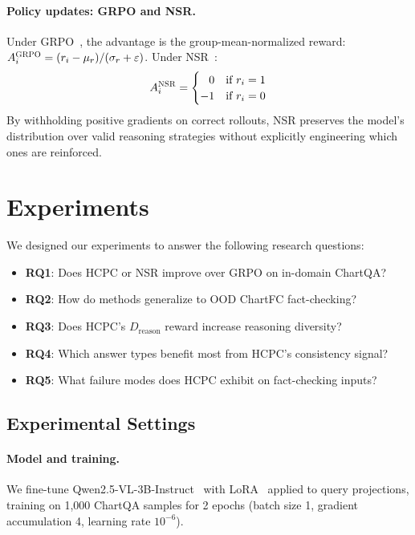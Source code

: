 \documentclass[11pt]{article}
\newcommand{\hcpc}{\textsc{HCPC}}
\newcommand{\grpo}{\textsc{GRPO}}
\newcommand{\nsr}{\textsc{NSR}}
\begin{document}
\paragraph{Policy updates: GRPO and NSR.}
Under \grpo{}~\citep{shao2024deepseekmath}, the advantage is the group-mean-normalized
reward: $A_i^{\grpo} = (r_i - \mu_r)/(\sigma_r + \varepsilon)$.
Under \nsr{}~\citep{zhu2025nsr}:
%
\begin{equation}
  A_i^{\nsr} =
  \begin{cases}
    \phantom{-}0  & \text{if } r_i = 1 \\
    -1            & \text{if } r_i = 0
  \end{cases}
  \label{eq:nsr}
\end{equation}
%
By withholding positive gradients on correct rollouts, \nsr{} preserves the
model's distribution over valid reasoning strategies without explicitly
engineering which ones are reinforced.

\section{Experiments}\label{sec:experiments}

We designed our experiments to answer the following research questions:
\begin{itemize}[leftmargin=*, itemsep=0.1em]
\item \textbf{RQ1}: Does \hcpc{} or \nsr{} improve over \grpo{} on in-domain ChartQA?
\item \textbf{RQ2}: How do methods generalize to OOD ChartFC fact-checking?
\item \textbf{RQ3}: Does \hcpc{}'s $D_\text{reason}$ reward increase reasoning diversity?
\item \textbf{RQ4}: Which answer types benefit most from \hcpc{}'s consistency signal?
\item \textbf{RQ5}: What failure modes does \hcpc{} exhibit on fact-checking inputs?
\end{itemize}

\subsection{Experimental Settings}

\paragraph{Model and training.}
We fine-tune Qwen2.5-VL-3B-Instruct~\citep{qwen25vl} with LoRA~\citep{hu2022lora}
applied to query projections, training on 1{,}000 ChartQA samples for 2 epochs
(batch size 1, gradient accumulation 4, learning rate $10^{-6}$).
\end{document}
